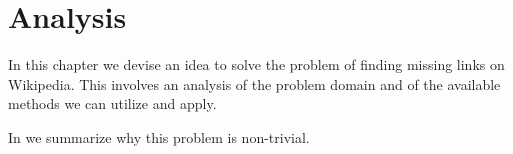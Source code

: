 \chapter{Analysis}\label{chap:idea}
In this chapter we devise an idea to solve the problem of finding missing links on Wikipedia. This involves an analysis of the problem domain and of the available methods we can utilize and apply.

\begin{chapterorganization}
  \item In  we summarize why this problem is non-trivial.
 
\end{chapterorganization}



